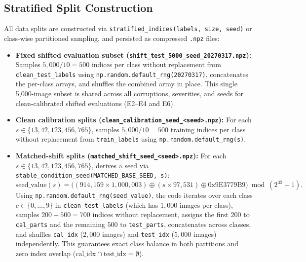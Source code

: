 \documentclass[11pt,a4paper]{article}
\begin{document}
\subsection{Stratified Split Construction}
All data splits are constructed via \texttt{stratified\_\allowbreak{}indices(labels, size, seed)} or class-wise partitioned sampling, and persisted as compressed \texttt{.npz} files:
\begin{itemize}
  \item \textbf{Fixed shifted evaluation subset (\texttt{shift\_\allowbreak{}test\_\allowbreak{}5000\_\allowbreak{}seed\_\allowbreak{}20270317.npz}):} Samples $5{,}000 / 10 = 500$ indices per class without replacement from \texttt{clean\_\allowbreak{}test\_\allowbreak{}labels} using \texttt{np.random.default\_\allowbreak{}rng(20270317)}, concatenates the per-class arrays, and shuffles the combined array in place. This single 5,000-image subset is shared across all corruptions, severities, and seeds for clean-calibrated shifted evaluations (E2--E4 and E6).
  \item \textbf{Clean calibration splits (\texttt{clean\_\allowbreak{}calibration\_\allowbreak{}seed\_\allowbreak{}<seed>.npz}):} For each $s \in \{13, 42, 123, 456, 765\}$, samples $5{,}000 / 10 = 500$ training indices per class without replacement from \texttt{train\_\allowbreak{}labels} using \texttt{np.random.default\_\allowbreak{}rng(s)}.
  \item \textbf{Matched-shift splits (\texttt{matched\_\allowbreak{}shift\_\allowbreak{}seed\_\allowbreak{}<seed>.npz}):} For each $s \in \{13, 42, 123, 456, 765\}$, derives a seed via \texttt{stable\_\allowbreak{}condition\_\allowbreak{}seed(MATCHED\_\allowbreak{}BASE\_\allowbreak{}SEED, s)}:
  \begin{equation}
    \label{eq:xor_seed}
    \text{seed\_value}(s) = \bigl((914{,}159 \times 1{,}000{,}003) \oplus (s \times 97{,}531) \oplus \text{0x9E3779B9}\bigr) \bmod (2^{32} - 1).
  \end{equation}
  Using \texttt{np.random.default\_\allowbreak{}rng(seed\_\allowbreak{}value)}, the code iterates over each class $c \in \{0, \dots, 9\}$ in \texttt{clean\_\allowbreak{}test\_\allowbreak{}labels} (which has $1{,}000$ images per class), samples $200 + 500 = 700$ indices without replacement, assigns the first $200$ to \texttt{cal\_\allowbreak{}parts} and the remaining $500$ to \texttt{test\_\allowbreak{}parts}, concatenates across classes, and shuffles \texttt{cal\_\allowbreak{}idx} ($2{,}000$ images) and \texttt{test\_\allowbreak{}idx} ($5{,}000$ images) independently. This guarantees exact class balance in both partitions and zero index overlap ($\text{cal\_idx} \cap \text{test\_idx} = \emptyset$).
\end{itemize}
\end{document}
